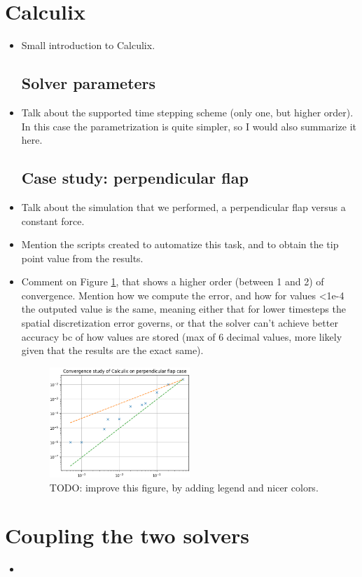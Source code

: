 \documentclass[
  english,        %
  font=times,     %
  onecolumn,      %
]{tumarticle}
\begin{document}
\section{Calculix}
\begin{itemize}
    \item Small introduction to Calculix.
    \subsection{Solver parameters}
    \item Talk about the supported time stepping scheme (only one, but higher order). In this case the parametrization is quite simpler, so I would also summarize it here.
    
    \subsection{Case study: perpendicular flap}
    \item Talk about the simulation that we performed, a perpendicular flap versus a constant force.
    \item Mention the scripts created to automatize this task, and to obtain the tip point value from the results.
    \item Comment on Figure \ref{fig:calculix_convergence}, that shows a higher order (between 1 and 2) of convergence. Mention how we compute the error, and how for values <1e-4 the outputed value is the same, meaning either that for lower timesteps the spatial discretization error governs, or that the solver can't achieve better accuracy bc of how values are stored (max of 6 decimal values, more likely given that the results are the exact same). 
    
    \begin{figure}
        \centering
        \includegraphics[width=0.5\textwidth]{resources/calculix_convergence_study.png}
        \caption{TODO: improve this figure, by adding legend and nicer colors.}
        \label{fig:calculix_convergence}
    \end{figure}

\end{itemize}

\section{Coupling the two solvers}
\begin{itemize}
    \item 
\end{itemize}
\end{document}

